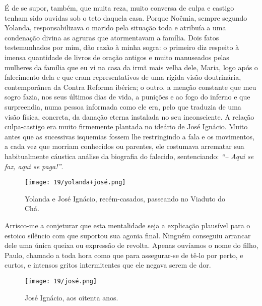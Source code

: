 É de se supor, também, que muita reza, muito conversa de culpa e castigo tenham sido ouvidas sob o teto daquela casa.
Porque Noêmia, sempre segundo Yolanda, responsabilizava o marido pela situação toda e atribuía a uma condenação divina as agruras que atormentavam a família.
Dois fatos testemunhados por mim, dão razão à minha sogra: o primeiro diz respeito à imensa quantidade de livros de oração antigos e muito manuseados pelas mulheres da família que eu vi na casa da irmã mais velha dele, Maria, logo após o falecimento dela e que eram representativos de uma rígida visão doutrinária, contemporânea da Contra Reforma ibérica; o outro, a menção constante que meu sogro fazia, nos seus últimos dias de vida, a punições e ao fogo do inferno e que surpreendia, numa pessoa informada como ele era, pelo que traduzia de uma visão física, concreta, da danação eterna instalada no seu inconsciente.
A relação culpa-castigo era muito firmemente plantada no ideário de José Ignácio.
Muito antes que as sucessivas isquemias fossem lhe restringindo a fala e os movimentos, a cada vez que morriam conhecidos ou parentes, ele costumava arrematar sua habitualmente cáustica análise da biografia do falecido, sentenciando: 
\textit{``-- Aqui se faz, aqui se paga!''}.

\begin{figure}
\centering
\texttt{[image: 19/yolanda+josé.png]}
\caption{Yolanda e José Ignácio, recém-casados, passeando no Viaduto do Chá.}
\end{figure}

Arrisco-me a conjeturar que esta mentalidade seja a explicação plausível para o estoico silêncio com que suportou sua agonia final.
Ninguém conseguiu arrancar dele uma única queixa ou expressão de revolta.
Apenas ouvíamos o nome do filho, Paulo, chamado a toda hora como que para assegurar-se de tê-lo por perto, e curtos, e intensos gritos intermitentes que ele negava serem de dor.

\begin{figure}
\centering
\texttt{[image: 19/josé.png]}
\caption{José Ignácio, aos oitenta anos.}
\end{figure}

